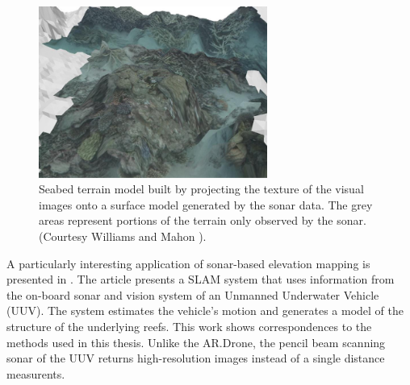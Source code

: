 \begin{figure}[htb]
\centering
\includegraphics[width=7.5cm]{images/williams_seabed_map.jpg}
\caption{Seabed terrain model built by projecting the texture of the visual images onto a surface model generated by the sonar data.
The grey areas represent portions of the terrain only observed by the sonar. (Courtesy Williams and Mahon \cite{williams2004simultaneous}).}
\label{fig:williams_seabed_map}
\end{figure}

A particularly interesting application of sonar-based elevation mapping is presented in \cite{williams2004simultaneous}.
The article presents a SLAM system that uses information from the on-board sonar and vision system of an Unmanned Underwater Vehicle (UUV).
The system estimates the vehicle's motion and generates a model of the structure of the underlying reefs.
This work shows correspondences to the methods used in this thesis.
Unlike the AR.Drone, the pencil beam scanning sonar of the UUV returns high-resolution images instead of a single distance measurents.

